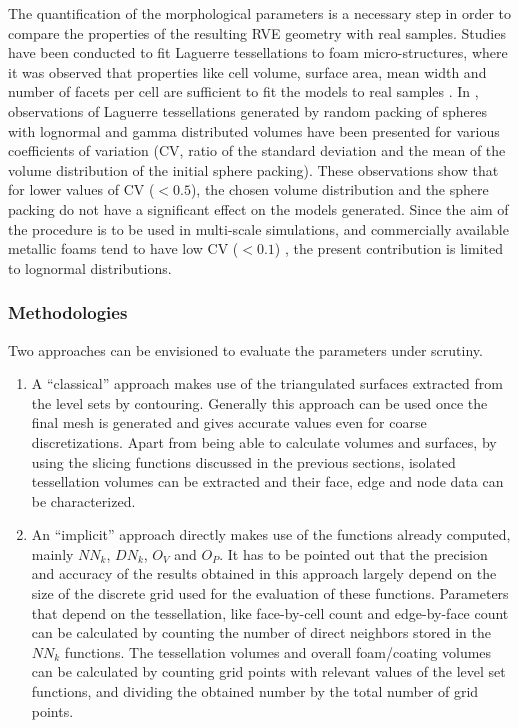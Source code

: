 The quantification of the morphological parameters is a necessary step in order to compare the properties of the resulting RVE geometry with real samples. Studies have been conducted to fit Laguerre tessellations to foam micro-structures, where it was observed that properties like cell volume, surface area, mean width and number of facets per cell are sufficient to fit the models to real samples \cite{vecchioAnglesLaguerreTessellation2014}. In \cite{redenbachMicrostructureModelsCellular2009}, observations of Laguerre tessellations generated by random packing of spheres with lognormal and gamma distributed volumes have been presented for various coefficients of variation (CV, ratio of the standard deviation and the mean of the volume distribution of the initial sphere packing). These observations show that for lower values of CV ($ <0.5 $), the chosen volume distribution and the sphere packing do not have a significant effect on the models generated. Since the aim of the procedure is to be used in multi-scale simulations, and commercially available metallic foams tend to have low CV ($ <0.1 $) \cite{perrotPeriodicUnitCell2007}, the present contribution is limited to lognormal distributions. 

\subsubsection{Methodologies}

Two approaches can be envisioned to evaluate the parameters under scrutiny.
\begin{enumerate}
	\item A ``classical'' approach makes use of the triangulated surfaces extracted from the level sets by contouring. Generally this approach can be used once the final mesh is generated and gives accurate values even for coarse discretizations. Apart from being able to calculate volumes and surfaces, by using the slicing functions discussed in the previous sections, isolated tessellation volumes can be extracted and their face, edge and node data can be characterized.
	\item An ``implicit'' approach directly makes use of the functions already computed, mainly $ NN_k $, $ DN_k $, $ O_V $ and $ O_P $. It has to be pointed out that the precision and accuracy of the results obtained in this approach largely depend on the size of the discrete grid used for the evaluation of these functions. Parameters that depend on the tessellation, like face-by-cell count and edge-by-face count can be calculated by counting the number of direct neighbors stored in the $ NN_k $ functions. The tessellation volumes and overall foam/coating volumes can be calculated by counting grid points with relevant values of the level set functions, and dividing the obtained number by the total number of grid points.
\end{enumerate}

